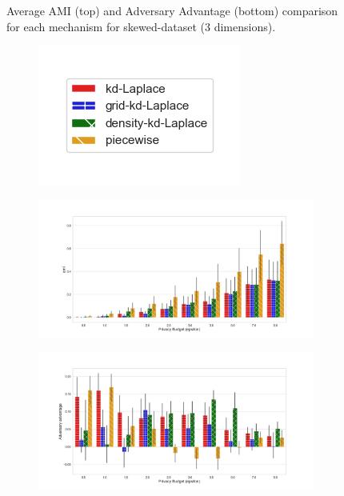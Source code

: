 {\begin{figure}[H]
\begin{subfigure}{1\textwidth}
  \end{subfigure}
  \caption{Average AMI (top) and Adversary Advantage (bottom) comparison for each mechanism for skewed-dataset (3 dimensions).}
  \label{fig:utility_skewed-dataset_comparison_nd_plot}
\end{figure}
\newpage



\begin{figure}[H]
  \centering
  \begin{subfigure}{0.30\textwidth}
    \includegraphics[width=\textwidth]{Results/kd-laplace/ami_bar_comparison_legend.png}
  \end{subfigure}
  \begin{subfigure}{1\textwidth}
    \includegraphics[width=1\textwidth]{Results/nd-laplace/ami_line-dataset_comparison.png}
  \end{subfigure}
  \begin{subfigure}{1\textwidth}
    \includegraphics[width=1\textwidth]{Results/nd-laplace/shokri_mi_adv_line-dataset_comparison.png}

\end{subfigure}
\end{figure}}
